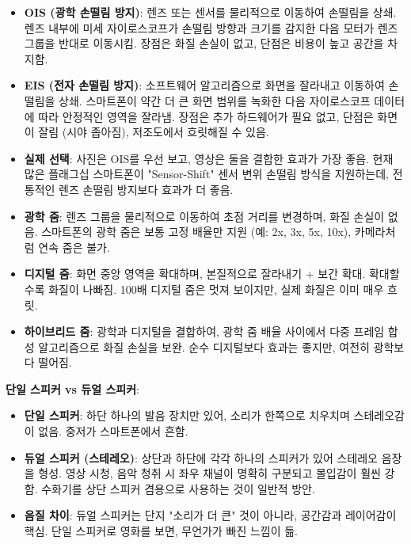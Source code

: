 \begin{itemize}
  \item \textbf{OIS (광학 손떨림 방지)}: 렌즈 또는 센서를 물리적으로 이동하여 손떨림을 상쇄. 렌즈 내부에 미세 자이로스코프가 손떨림 방향과 크기를 감지한 다음 모터가 렌즈 그룹을 반대로 이동시킴. 장점은 화질 손실이 없고, 단점은 비용이 높고 공간을 차지함.
  \item \textbf{EIS (전자 손떨림 방지)}: 소프트웨어 알고리즘으로 화면을 잘라내고 이동하여 손떨림을 상쇄. 스마트폰이 약간 더 큰 화면 범위를 녹화한 다음 자이로스코프 데이터에 따라 안정적인 영역을 잘라냄. 장점은 추가 하드웨어가 필요 없고, 단점은 화면이 잘림 (시야 좁아짐), 저조도에서 흐릿해질 수 있음.
  \item \textbf{실제 선택}: 사진은 OIS를 우선 보고, 영상은 둘을 결합한 효과가 가장 좋음. 현재 많은 플래그십 스마트폰이 "Sensor-Shift" 센서 변위 손떨림 방식을 지원하는데, 전통적인 렌즈 손떨림 방지보다 효과가 더 좋음.
\end{itemize}


\begin{itemize}
  \item \textbf{광학 줌}: 렌즈 그룹을 물리적으로 이동하여 초점 거리를 변경하며, 화질 손실이 없음. 스마트폰의 광학 줌은 보통 고정 배율만 지원 (예: 2x, 3x, 5x, 10x), 카메라처럼 연속 줌은 불가.
  \item \textbf{디지털 줌}: 화면 중앙 영역을 확대하며, 본질적으로 잘라내기 + 보간 확대. 확대할수록 화질이 나빠짐. 100배 디지털 줌은 멋져 보이지만, 실제 화질은 이미 매우 흐릿.
  \item \textbf{하이브리드 줌}: 광학과 디지털을 결합하여, 광학 줌 배율 사이에서 다중 프레임 합성 알고리즘으로 화질 손실을 보완. 순수 디지털보다 효과는 좋지만, 여전히 광학보다 떨어짐.
\end{itemize}


\textbf{단일 스피커 vs 듀얼 스피커}:

\begin{itemize}
  \item \textbf{단일 스피커}: 하단 하나의 발음 장치만 있어, 소리가 한쪽으로 치우치며 스테레오감이 없음. 중저가 스마트폰에서 흔함.
  \item \textbf{듀얼 스피커 (스테레오)}: 상단과 하단에 각각 하나의 스피커가 있어 스테레오 음장을 형성. 영상 시청, 음악 청취 시 좌우 채널이 명확히 구분되고 몰입감이 훨씬 강함. 수화기를 상단 스피커 겸용으로 사용하는 것이 일반적 방안.
  \item \textbf{음질 차이}: 듀얼 스피커는 단지 "소리가 더 큰" 것이 아니라, 공간감과 레이어감이 핵심. 단일 스피커로 영화를 보면, 무언가가 빠진 느낌이 듦.
\end{itemize}

